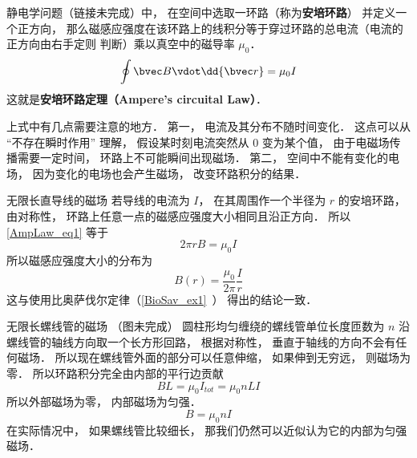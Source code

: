 
\begin{issues}
\end{issues}

静电学问题（链接未完成）中， 在空间中选取一环路（称为\textbf{安培环路}） 并定义一个正方向， 那么磁感应强度在该环路上的线积分等于穿过环路的总电流（电流的正方向由右手定则 判断）乘以真空中的磁导率 $\mu_0$．
\begin{equation}\label{AmpLaw_eq1}
\oint \bvec B \vdot \dd{\bvec r} = \mu_0 I
\end{equation}
这就是\textbf{安培环路定理（Ampere's circuital Law）}．

上式中有几点需要注意的地方． 第一， 电流及其分布不随时间变化． 这点可以从 “不存在瞬时作用” 理解， 假设某时刻电流突然从 0 变为某个值， 由于电磁场传播需要一定时间， 环路上不可能瞬间出现磁场． 第二， 空间中不能有变化的电场， 因为变化的电场也会产生磁场， 改变环路积分的结果．%

\begin{example}{无限长直导线的磁场}\label{AmpLaw_ex1}
若导线的电流为 $I$， 在其周围作一个半径为 $r$ 的安培环路， 由对称性， 环路上任意一点的磁感应强度大小相同且沿正方向． 所以\autoref{AmpLaw_eq1} 等于
\begin{equation}
2\pi r B = \mu_0 I
\end{equation}
所以磁感应强度大小的分布为
\begin{equation}
B(r) = \frac{\mu_0}{2\pi} \frac Ir
\end{equation}
这与使用比奥萨伐尔定律（\autoref{BioSav_ex1}~） 得出的结论一致．
\end{example}

\begin{example}{无限长螺线管的磁场}\label{AmpLaw_ex2}
（图未完成） 
圆柱形均匀缠绕的螺线管单位长度匝数为 $n$ 沿螺线管的轴线方向取一个长方形回路， 根据对称性， 垂直于轴线的方向不会有任何磁场． 所以现在螺线管外面的部分可以任意伸缩， 如果伸到无穷远， 则磁场为零． 所以环路积分完全由内部的平行边贡献
\begin{equation}
BL = \mu_0 I_{tot} = \mu_0 nLI
\end{equation}
所以外部磁场为零， 内部磁场为匀强．
\begin{equation}
B = \mu_0 nI
\end{equation}
在实际情况中， 如果螺线管比较细长， 那我们仍然可以近似认为它的内部为匀强磁场．
\end{example}

